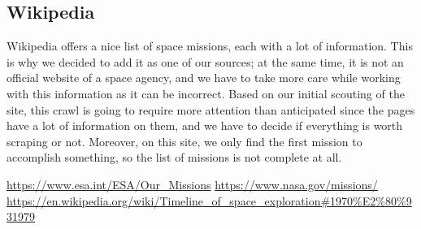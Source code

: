 \documentclass{article}
\begin{document}
\subsection{Wikipedia}\label{subsec:wikipedia}
Wikipedia offers a nice list of space missions, each with a lot of information. This is why we decided to add it as one of our sources; at the same time, it is not an official website of a space agency, and we have to take more care while working with this information as it can be incorrect. Based on our initial scouting of the site, this crawl is going to require more attention than anticipated since the pages have a lot of information on them, and we have to decide if everything is worth scraping or not. Moreover, on this site, we only find the first mission to accomplish something, so the list of missions is not complete at all.


\begin{thebibliography}{9}
     \url{https://www.esa.int/ESA/Our_Missions}
     \url{https://www.nasa.gov/missions/}
     \url{https://en.wikipedia.org/wiki/Timeline_of_space_exploration#1970%E2%80%931979}
\end{thebibliography}
\end{document}
